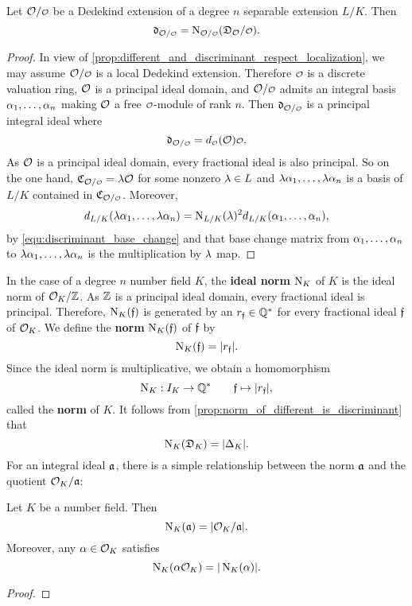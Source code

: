     \begin{proposition}\label{prop:norm_of_different_is_discriminant}
      Let $\mc{O}/\smc{O}$ be a Dedekind extension of a degree $n$ separable extension $L/K$. Then
      \[
        \mf{d}_{\mc{O}/\smc{O}} = \Norm_{\mc{O}/\smc{O}}(\mf{D}_\mc{O}/\smc{O}).
      \] 
    \end{proposition}
    \begin{proof}
      In view of \cref{prop:different_and_discriminant_respect_localization}, we may assume $\mc{O}/\smc{O}$ is a local Dedekind extension. Therefore $\smc{O}$ is a discrete valuation ring, $\mathcal{O}$ is a principal ideal domain, and $\mc{O}/\smc{O}$ admits an integral basis $\alpha_{1},\ldots,\alpha_{n}$ making $\mathcal{O}$ a free $\smc{O}$-module of rank $n$. Then $\mf{d}_{\mc{O}/\smc{O}}$ is a principal integral ideal where
      \[
        \mf{d}_{\mc{O}/\smc{O}} = d_{\smc{O}}(\mc{O})\smc{O}.
      \]
      As $\mathcal{O}$ is a principal ideal domain, every fractional ideal is also principal. So on the one hand, $\mf{C}_{\mc{O}/\smc{O}} = \l\mc{O}$ for some nonzero $\lambda \in L$ and $\lambda\alpha_{1},\ldots,\lambda\alpha_{n}$ is a basis of $L/K$ contained in $\mf{C}_{\mc{O}/\smc{O}}$. Moreover,
      \[
        d_{L/K}(\lambda\alpha_{1},\ldots,\lambda\alpha_{n}) = \operatorname{\mathrm{N}}_{L/K}(\lambda)^{2}d_{L/K}(\alpha_{1},\ldots,\alpha_{n}),
      \]
      by \cref{equ:discriminant_base_change} and that base change matrix from $\alpha_{1},\ldots,\alpha_{n}$ to $\lambda\alpha_{1},\ldots,\lambda\alpha_{n}$ is the multiplication by $\lambda$ map. 
    \end{proof}

    In the case of a degree $n$ number field $K$, the \textbf{ideal norm} $\operatorname{\mathrm{N}}_{K}$ of $K$ is the ideal norm of $\mathcal{O}_{K}/\mathbb{Z}$. As $\mathbb{Z}$ is a principal ideal domain, every fractional ideal is principal. Therefore, $\operatorname{\mathrm{N}}_{K}(\mathfrak{f})$ is generated by an $r_{\mathfrak{f}} \in \mathbb{Q}^{\ast}$ for every fractional ideal $\mathfrak{f}$ of $\mathcal{O}_{K}$. We define the \textbf{norm} $\operatorname{\mathrm{N}}_{K}(\mathfrak{f})$ of $\mathfrak{f}$ by
    \[
      \operatorname{\mathrm{N}}_{K}(\mathfrak{f}) = |r_{\mathfrak{f}}|.
    \]
    Since the ideal norm is multiplicative, we obtain a homomorphism
    \[
      \operatorname{\mathrm{N}}_{K}:I_{K} \to \mathbb{Q}^{\ast} \qquad \mathfrak{f} \mapsto |r_{\mathfrak{f}}|,
    \]
    called the \textbf{norm} of $K$. It follows from \cref{prop:norm_of_different_is_discriminant} that
    \[
      \operatorname{\mathrm{N}}_{K}(\mathfrak{D}_{K}) = |\Delta_{K}|.
    \]
    For an integral ideal $\mathfrak{a}$, there is a simple relationship between the norm $\mathfrak{a}$ and the quotient $\mathcal{O}_{K}/\mathfrak{a}$:

    \begin{proposition}\label{prop:norm_and_field_norms_are_identical}
      Let $K$ be a number field. Then
      \[
        \operatorname{\mathrm{N}}_{K}(\mathfrak{a}) = |\mathcal{O}_{K}/\mathfrak{a}|.
      \]
      Moreover, any $\alpha \in \mathcal{O}_{K}$ satisfies
      \[
        \operatorname{\mathrm{N}}_{K}(\alpha\mathcal{O}_{K}) = |\operatorname{\mathrm{N}}_{K}(\alpha)|.
      \]
    \end{proposition}
    \begin{proof}
    \end{proof}

